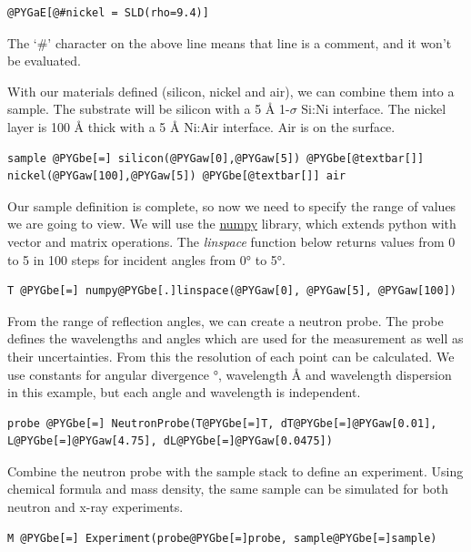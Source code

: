 \documentclass[letterpaper,10pt,english]{sphinxmanual}
\begin{document}
\begin{Verbatim}[commandchars=@\[\]]
@PYGaE[@#nickel = SLD(rho=9.4)]
\end{Verbatim}

The `\#' character on the above line means that line is a comment, and
it won't be evaluated.

With our materials defined (silicon, nickel and air), we can combine
them into a sample. The substrate will be silicon with a 5 Å
1-$\sigma$ Si:Ni interface.  The nickel layer is 100 Å thick
with a 5 Å Ni:Air interface.  Air is on the surface.

\begin{Verbatim}[commandchars=@\[\]]
sample @PYGbe[=] silicon(@PYGaw[0],@PYGaw[5]) @PYGbe[@textbar[]] nickel(@PYGaw[100],@PYGaw[5]) @PYGbe[@textbar[]] air
\end{Verbatim}

Our sample definition is complete, so now we need to specify the
range of values we are going to view.  We will use the
\href{http://numpy.scipy.org/}{numpy} library, which extends python
with vector and matrix operations.  The \emph{linspace} function below
returns values from 0 to 5 in 100 steps for incident angles
from 0° to 5°.

\begin{Verbatim}[commandchars=@\[\]]
T @PYGbe[=] numpy@PYGbe[.]linspace(@PYGaw[0], @PYGaw[5], @PYGaw[100])
\end{Verbatim}

From the range of reflection angles, we can create a neutron probe. The probe
defines the wavelengths and angles which are used for the measurement as well
as their uncertainties.  From this the resolution of each point can be
calculated.  We use constants for angular divergence °,
wavelength  Å and wavelength dispersion  in this
example, but each angle and wavelength is independent.

\begin{Verbatim}[commandchars=@\[\]]
probe @PYGbe[=] NeutronProbe(T@PYGbe[=]T, dT@PYGbe[=]@PYGaw[0.01], L@PYGbe[=]@PYGaw[4.75], dL@PYGbe[=]@PYGaw[0.0475])
\end{Verbatim}

Combine the neutron probe with the sample stack to define an
experiment.  Using chemical formula and mass density, the same
sample can be simulated for both neutron and x-ray experiments.

\begin{Verbatim}[commandchars=@\[\]]
M @PYGbe[=] Experiment(probe@PYGbe[=]probe, sample@PYGbe[=]sample)
\end{Verbatim}
\end{document}
